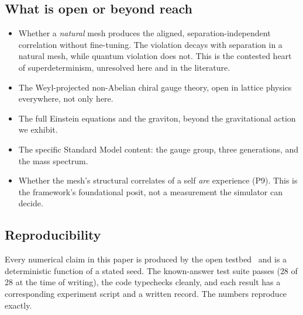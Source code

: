 \subsection{What is open or beyond reach}

\begin{itemize}
\item Whether a \emph{natural} mesh produces the aligned, separation-independent correlation without fine-tuning. The violation decays with separation in a natural mesh, while quantum violation does not. This is the contested heart of superdeterminism, unresolved here and in the literature.
\item The Weyl-projected non-Abelian chiral gauge theory, open in lattice physics everywhere, not only here.
\item The full Einstein equations and the graviton, beyond the gravitational action we exhibit.
\item The specific Standard Model content: the gauge group, three generations, and the mass spectrum.
\item Whether the mesh's structural correlates of a self \emph{are} experience (P9). This is the framework's foundational posit, not a measurement the simulator can decide.
\end{itemize}

\subsection{Reproducibility}

Every numerical claim in this paper is produced by the open testbed~\cite{pollard2026vibetest} and is a deterministic function of a stated seed. The known-answer test suite passes ($28$ of $28$ at the time of writing), the code typechecks cleanly, and each result has a corresponding experiment script and a written record. The numbers reproduce exactly.
